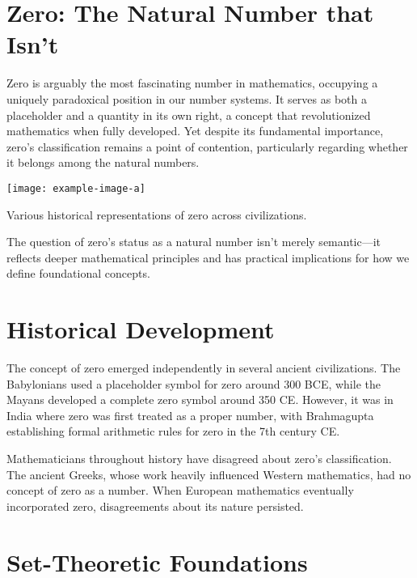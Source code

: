 \section{Zero: The Natural Number that Isn't}

Zero is arguably the most fascinating number in mathematics, occupying a uniquely paradoxical position in our number systems. It serves as both a placeholder and a quantity in its own right, a concept that revolutionized mathematics when fully developed. Yet despite its fundamental importance, zero's classification remains a point of contention, particularly regarding whether it belongs among the natural numbers.

\begin{marginfigure}
\texttt{[image: example-image-a]}
\caption{Various historical representations of zero across civilizations.}
\end{marginfigure}

The question of zero's status as a natural number isn't merely semantic---it reflects deeper mathematical principles and has practical implications for how we define foundational concepts.

\section{Historical Development}

The concept of zero emerged independently in several ancient civilizations. The Babylonians used a placeholder symbol for zero around 300 BCE, while the Mayans developed a complete zero symbol around 350 CE. However, it was in India where zero was first treated as a proper number, with Brahmagupta establishing formal arithmetic rules for zero in the 7th century CE.


Mathematicians throughout history have disagreed about zero's classification. The ancient Greeks, whose work heavily influenced Western mathematics, had no concept of zero as a number. When European mathematics eventually incorporated zero, disagreements about its nature persisted.

\section{Set-Theoretic Foundations}


